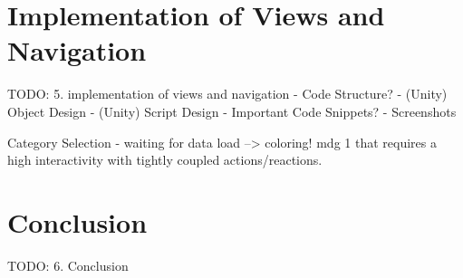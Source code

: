 \section{Implementation of Views and Navigation}


TODO:
5. implementation of views and navigation
- Code Structure?
- (Unity) Object Design
- (Unity) Script Design
- Important Code Snippets?
- Screenshots



Category Selection - waiting for data load --> coloring!
\gls{mdg} 1 that requires a high interactivity with tightly coupled actions/reactions.



\section{Conclusion}


TODO:
6. Conclusion






